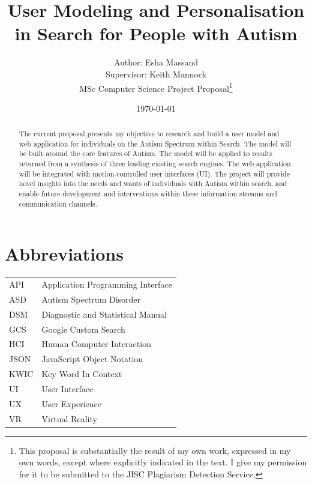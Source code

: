 \documentclass[a4paper, 11pt]{article}
\begin{document}
\begin{titlepage}

\title{User Modeling and Personalisation in Search for People with Autism}
\author{Author: Esha Massand\\Supervisor: Keith Mannock\\
MSc Computer Science Project Proposal\footnote{This proposal is substantially the result of my own work, expressed in my own words, except where explicitly indicated in the text. I give my permission for it to be submitted to the JISC Plagiarism Detection Service. }}
\date{\today}
\maketitle


\begin{abstract}
The current proposal presents my objective to research and build a user model and web application for individuals on the Autism Spectrum within Search. The model will be built around the core features of Autism. The model will be applied to results returned from a synthesis of three leading existing search engines. The web application will be integrated with motion-controlled user interfaces (UI). The project will provide novel insights into the needs and wants of individuals with Autism within search, and enable future development and interventions within these information streams and communication channels.
\end{abstract}
\end{titlepage}
\clearpage


\section{Abbreviations}
\begin{tabular}{l l }
API & Application Programming Interface\\
ASD & Autism Spectrum Disorder\\
DSM & Diagnostic and Statistical Manual\\
GCS & Google Custom Search\\
HCI & Human Computer Interaction\\
JSON & JavaScript Object Notation\\
KWIC & Key Word In Context\\
UI & User Interface\\
UX & User Experience\\
VR & Virtual Reality\\
\end{tabular}
\clearpage
\end{document}
